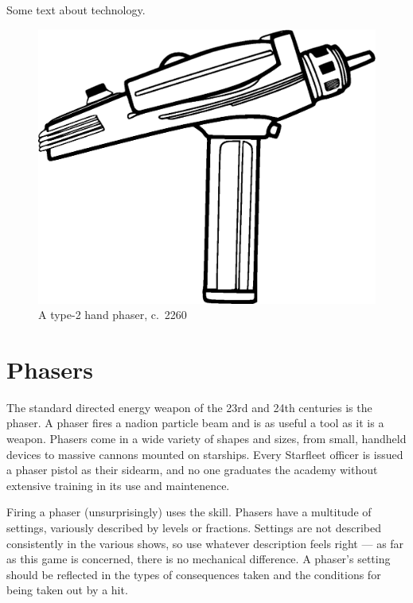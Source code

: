 \documentclass[12pt,titlepage,openany]{book}
\begin{document}
Some text about technology.

\begin{figure}
    \centering
    \includegraphics[width=0.8\linewidth]{img/Phaser.eps}\\
    \vspace{1ex}
    \small A type-2 hand phaser, c.\ 2260
\end{figure}

\section{Phasers}\label{sec:phasers}

The standard directed energy weapon of the 23rd and 24th centuries is the
phaser. A phaser fires a nadion particle beam and is as useful a tool as it is
a weapon. Phasers come in a wide variety of shapes and sizes, from small,
handheld devices to massive cannons mounted on starships. Every Starfleet
officer is issued a phaser pistol as their sidearm, and no one graduates the
academy without extensive training in its use and maintenence.

Firing a phaser (unsurprisingly) uses the  skill. Phasers have a
multitude of settings, variously described by levels or fractions. Settings are
not described consistently in the various \StarTrek{} shows, so use whatever
description feels right --- as far as this game is concerned, there is no
mechanical difference. A phaser's setting should be reflected in the types of
consequences taken and the conditions for being taken out by a hit.
\end{document}
